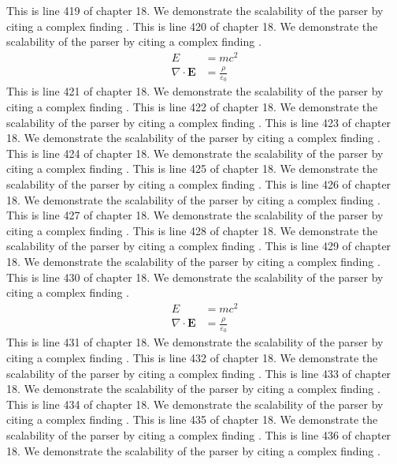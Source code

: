 This is line 419 of chapter 18. We demonstrate the scalability of the parser by citing a complex finding \cite{ref18_419}.
This is line 420 of chapter 18. We demonstrate the scalability of the parser by citing a complex finding \cite{ref18_420}.
\begin{align*}
  E &= mc^2 \\
  \nabla \cdot \mathbf{E} &= \frac{\rho}{\varepsilon_0}
\end{align*}
This is line 421 of chapter 18. We demonstrate the scalability of the parser by citing a complex finding \cite{ref18_421}.
This is line 422 of chapter 18. We demonstrate the scalability of the parser by citing a complex finding \cite{ref18_422}.
This is line 423 of chapter 18. We demonstrate the scalability of the parser by citing a complex finding \cite{ref18_423}.
This is line 424 of chapter 18. We demonstrate the scalability of the parser by citing a complex finding \cite{ref18_424}.
This is line 425 of chapter 18. We demonstrate the scalability of the parser by citing a complex finding \cite{ref18_425}.
This is line 426 of chapter 18. We demonstrate the scalability of the parser by citing a complex finding \cite{ref18_426}.
This is line 427 of chapter 18. We demonstrate the scalability of the parser by citing a complex finding \cite{ref18_427}.
This is line 428 of chapter 18. We demonstrate the scalability of the parser by citing a complex finding \cite{ref18_428}.
This is line 429 of chapter 18. We demonstrate the scalability of the parser by citing a complex finding \cite{ref18_429}.
This is line 430 of chapter 18. We demonstrate the scalability of the parser by citing a complex finding \cite{ref18_430}.
\begin{align*}
  E &= mc^2 \\
  \nabla \cdot \mathbf{E} &= \frac{\rho}{\varepsilon_0}
\end{align*}
This is line 431 of chapter 18. We demonstrate the scalability of the parser by citing a complex finding \cite{ref18_431}.
This is line 432 of chapter 18. We demonstrate the scalability of the parser by citing a complex finding \cite{ref18_432}.
This is line 433 of chapter 18. We demonstrate the scalability of the parser by citing a complex finding \cite{ref18_433}.
This is line 434 of chapter 18. We demonstrate the scalability of the parser by citing a complex finding \cite{ref18_434}.
This is line 435 of chapter 18. We demonstrate the scalability of the parser by citing a complex finding \cite{ref18_435}.
This is line 436 of chapter 18. We demonstrate the scalability of the parser by citing a complex finding \cite{ref18_436}.
